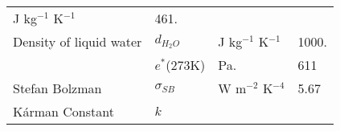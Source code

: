 \begin{longtable}[]{@{}llll@{}}
\begin{minipage}[t]{0.22\columnwidth}
J kg\(^{-1}\) K\(^{-1}\)\strut
\end{minipage} & \begin{minipage}[t]{0.22\columnwidth}\raggedright
461.\strut
\end{minipage}\tabularnewline
\begin{minipage}[t]{0.22\columnwidth}\raggedright
Density of liquid water\strut
\end{minipage} & \begin{minipage}[t]{0.22\columnwidth}\raggedright
\(d_{H_2O}\)\strut
\end{minipage} & \begin{minipage}[t]{0.22\columnwidth}\raggedright
J kg\(^{-1}\) K\(^{-1}\)\strut
\end{minipage} & \begin{minipage}[t]{0.22\columnwidth}\raggedright
1000.\strut
\end{minipage}\tabularnewline
\begin{minipage}[t]{0.22\columnwidth}\raggedright
\strut
\end{minipage} & \begin{minipage}[t]{0.22\columnwidth}\raggedright
\(e^*\)(273K)\strut
\end{minipage} & \begin{minipage}[t]{0.22\columnwidth}\raggedright
Pa.\strut
\end{minipage} & \begin{minipage}[t]{0.22\columnwidth}\raggedright
611\strut
\end{minipage}\tabularnewline
\begin{minipage}[t]{0.22\columnwidth}\raggedright
Stefan Bolzman\strut
\end{minipage} & \begin{minipage}[t]{0.22\columnwidth}\raggedright
\(\sigma_{SB}\)\strut
\end{minipage} & \begin{minipage}[t]{0.22\columnwidth}\raggedright
W m\(^{-2}\) K\(^{-4}\)\strut
\end{minipage} & \begin{minipage}[t]{0.22\columnwidth}\raggedright
5.67\strut
\end{minipage}\tabularnewline
\begin{minipage}[t]{0.22\columnwidth}\raggedright
Kárman Constant\strut
\end{minipage} & \begin{minipage}[t]{0.22\columnwidth}\raggedright
\(k\)\strut
\end{minipage} & \begin{minipage}[t]{0.22\columnwidth}\raggedright

\end{minipage}
\end{longtable}
